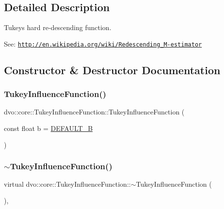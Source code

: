 \subsection{Detailed Description}
Tukey\textquotesingle{}s hard re-\/descending function.

See\+: \href{http://en.wikipedia.org/wiki/Redescending_M-estimator}{\tt http\+://en.\+wikipedia.\+org/wiki/\+Redescending\+\_\+\+M-\/estimator} 

\subsection{Constructor \& Destructor Documentation}
\mbox{\label{classdvo_1_1core_1_1_tukey_influence_function_a5cce8b94396e7065d59fea7ef80fd768}} 
\subsubsection{\texorpdfstring{Tukey\+Influence\+Function()}{TukeyInfluenceFunction()}}
{\footnotesize\ttfamily dvo\+::core\+::\+Tukey\+Influence\+Function\+::\+Tukey\+Influence\+Function (\begin{DoxyParamCaption}\item[{const float}]{b = {\ttfamily \mbox{\hyperlink{classdvo_1_1core_1_1_tukey_influence_function_a4abcd23e283b3152de20aaf8eb092e26}{D\+E\+F\+A\+U\+L\+T\+\_\+B}}} }\end{DoxyParamCaption})}

\mbox{\label{classdvo_1_1core_1_1_tukey_influence_function_a754e8e9a16c391fa9234bc8c47183567}} 
\subsubsection{\texorpdfstring{$\sim$\+Tukey\+Influence\+Function()}{~TukeyInfluenceFunction()}}
{\footnotesize\ttfamily virtual dvo\+::core\+::\+Tukey\+Influence\+Function\+::$\sim$\+Tukey\+Influence\+Function (\begin{DoxyParamCaption}{ }\end{DoxyParamCaption})\hspace{0.3cm}{\ttfamily [inline]}, {\ttfamily [virtual]}}



